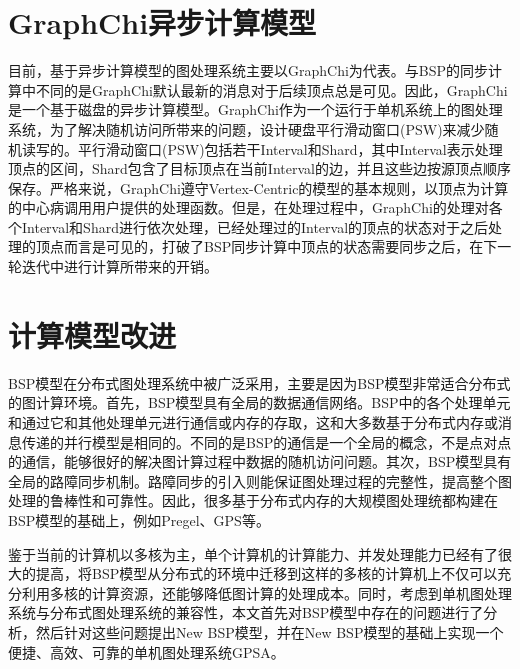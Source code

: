 \section{GraphChi异步计算模型}
目前，基于异步计算模型的图处理系统主要以GraphChi为代表。与BSP的同步计算中不同的是GraphChi默认最新的消息对于后续顶点总是可见。因此，GraphChi是一个基于磁盘的异步计算模型。GraphChi作为一个运行于单机系统上的图处理系统，为了解决随机访问所带来的问题，设计硬盘平行滑动窗口(PSW)来减少随机读写的。平行滑动窗口(PSW)包括若干Interval和Shard，其中Interval表示处理顶点的区间，Shard包含了目标顶点在当前Interval的边，并且这些边按源顶点顺序保存。严格来说，GraphChi遵守Vertex-Centric的模型的基本规则，以顶点为计算的中心病调用用户提供的处理函数。但是，在处理过程中，GraphChi的处理对各个Interval和Shard进行依次处理，已经处理过的Interval的顶点的状态对于之后处理的顶点而言是可见的，打破了BSP同步计算中顶点的状态需要同步之后，在下一轮迭代中进行计算所带来的开销。

\section{计算模型改进}

BSP模型在分布式图处理系统中被广泛采用，主要是因为BSP模型非常适合分布式的图计算环境。首先，BSP模型具有全局的数据通信网络。BSP中的各个处理单元和通过它和其他处理单元进行通信或内存的存取，这和大多数基于分布式内存或消息传递的并行模型是相同的。不同的是BSP的通信是一个全局的概念，不是点对点的通信，能够很好的解决图计算过程中数据的随机访问问题。其次，BSP模型具有全局的路障同步机制。路障同步的引入则能保证图处理过程的完整性，提高整个图处理的鲁棒性和可靠性。因此，很多基于分布式内存的大规模图处理统都构建在BSP模型的基础上，例如Pregel、GPS等。

鉴于当前的计算机以多核为主，单个计算机的计算能力、并发处理能力已经有了很大的提高，将BSP模型从分布式的环境中迁移到这样的多核的计算机上不仅可以充分利用多核的计算资源，还能够降低图计算的处理成本。同时，考虑到单机图处理系统与分布式图处理系统的兼容性，本文首先对BSP模型中存在的问题进行了分析，然后针对这些问题提出New BSP模型，并在New BSP模型的基础上实现一个便捷、高效、可靠的单机图处理系统GPSA。


